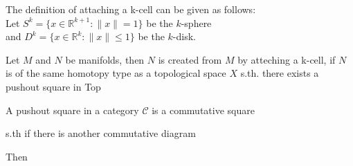 \documentclass{article}
\theoremstyle{plain}
\theoremstyle{plain}
\theoremstyle{plain}
\theoremstyle{definition}
\theoremstyle{remark}
\begin{document}
The definition of attaching a k-cell can be given as follows: \\
Let $S^k = \{x \in \mathbb{R}^{k+1} : \lVert x \rVert = 1\}$ be the $k$-sphere \\
and $D^k = \{ x \in \mathbb{R}^k : \lVert x \rVert \leq 1 \}$ be the $k$-disk.

Let $M$ and $N$ be manifolds, then $N$ is created from $M$ by atteching a k-cell,
if $N$ is of the same homotopy type as a topological space $X$ s.th. there exists 
a pushout square in Top

\begin{figure}[H]
   \centering
\end{figure}

A pushout square in a category $\mathcal{C}$ is a commutative square 

\begin{figure}[H]
   \centering
\end{figure}      
   
s.th if there is another commutative diagram

\begin{figure}[H]
   \centering
\end{figure}

Then 

\begin{figure}[H]
   \centering
\end{figure}
\end{document}

